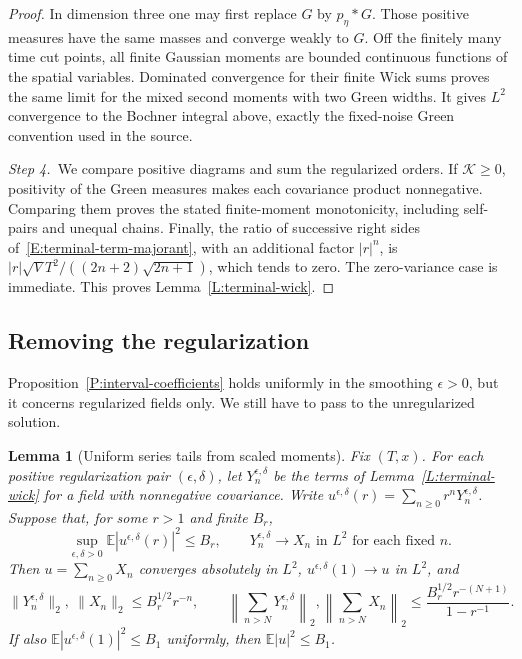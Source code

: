 \documentclass[12pt,oneside,openany]{book}
\makeatletter
\let\lean@pending\@empty
\newcommand{\LeanMarker}[1]{\gdef\lean@pending{#1}}
\numberwithin{equation}{section}
\newtheorem{lemma}[theorem]{Lemma}
\theoremstyle{nogostyle}
\theoremstyle{definition}
\newcommand{\E}{\mathbb{E}}
\makeatother
\begin{document}
\begin{proof}
  In dimension three one may first replace $G$ by $p_\eta*G$. Those positive
  measures have the same masses and converge weakly to $G$. Off the finitely
  many time cut points, all finite Gaussian moments are bounded continuous
  functions of the spatial variables. Dominated convergence for their finite
  Wick sums proves the same limit for the mixed second moments with two Green
  widths. It gives $L^2$ convergence to the Bochner integral above, exactly the
  fixed-noise Green convention used in the source.


  \medskip
  \noindent\textit{Step 4.~}We compare positive diagrams and sum the
  regularized orders.
  If $\mathcal{K} \ge 0$, positivity of the Green measures makes each covariance
  product nonnegative. Comparing them proves the stated finite-moment
  monotonicity, including self-pairs and unequal chains. Finally, the ratio of
  successive right sides of~\eqref{E:terminal-term-majorant}, with an additional
  factor $|r|^n$, is $|r|\sqrt V T^2/((2n+2)\sqrt{2n+1})$, which tends to zero.
  The zero-variance case is immediate. This proves Lemma~\ref{L:terminal-wick}.
\end{proof}

\subsection{Removing the regularization}

Proposition~\ref{P:interval-coefficients} holds uniformly in the smoothing
$\epsilon > 0$, but it concerns regularized fields only. We still have to pass
to the unregularized solution.

\LeanMarker{L:uniform-series-tail}
\begin{lemma}[Uniform series tails from scaled moments]\label{L:uniform-series-tail}
  Fix $(T,x)$. For each positive regularization pair $(\epsilon,\delta)$, let
  $Y_n^{\epsilon,\delta}$ be the terms of Lemma~\ref{L:terminal-wick} for a
  field with nonnegative covariance. Write $u^{\epsilon,\delta}(r) =
  \sum_{n\ge0}r^nY_n^{\epsilon,\delta}$. Suppose that, for some $r > 1$ and
  finite $B_r$,
  \[
    \sup_{\epsilon,\delta>0}
    \E|u^{\epsilon,\delta}(r)|^2\le B_r,
    \qquad
    Y_n^{\epsilon,\delta}\longrightarrow X_n
    \text{ in }L^2\text{ for each fixed }n.
  \]
  Then $u = \sum_{n\ge0}X_n$ converges absolutely in $L^2$,
  $u^{\epsilon,\delta}(1) \to u$ in $L^2$, and
  \begin{equation}\label{E:uniform-series-tail}
    \|Y_n^{\epsilon,\delta}\|_2,\ \|X_n\|_2
    \le B_r^{1/2}r^{-n},\qquad
    \left\|\sum_{n>N}Y_n^{\epsilon,\delta}\right\|_2,
    \left\|\sum_{n>N}X_n\right\|_2
    \le\frac{B_r^{1/2}r^{-(N+1)}}{1-r^{-1}}.
  \end{equation}
  If also $\E|u^{\epsilon,\delta}(1)|^2 \le B_1$ uniformly, then $\E|u|^2 \le
  B_1$.
\end{lemma}
\end{document}
